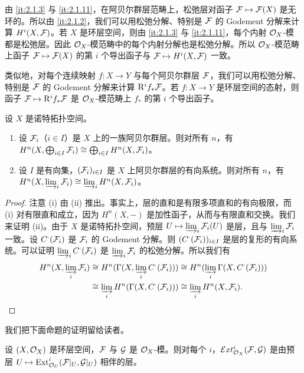 由 \ref{it:2.1.3} 与 \ref{it:2.1.11}，在阿贝尔群层范畴上，松弛层对函子 $\mathcal{F}\mapsto\mathcal{F}(X)$ 是无环的。所以由 \ref{it:2.1.2}，我们可以用松弛分解、特别是 $\mathcal{F}$ 的 Godement 分解来计算 $H^i(X,\mathcal{F})$。若 $X$ 是环层空间，则由 \ref{it:2.1.3} 与 \ref{it:2.1.11}，每个内射 $\mathcal{O}_X$-模都是松弛层。因此 $\mathcal{O}_X$-模范畴中的每个内射分解也是松弛分解。所以 $\mathcal{O}_X$-模范畴上函子 $\mathcal{F}\mapsto\mathcal{F}(X)$ 的第 $i$ 个导出函子与 $\mathcal{F}\mapsto H^i(X,\mathcal{F})$ 一致。

类似地，对每个连续映射 $f\colon X\to Y$ 与每个阿贝尔群层 $\mathcal{F}$，我们可以用松弛分解、特别是 $\mathcal{F}$ 的 Godement 分解来计算 $\mathrm{R}^if_*\mathcal{F}$。若 $f\colon X\to Y$ 是环层空间的态射，则函子 $\mathcal{F}\mapsto\mathrm{R}^if_*\mathcal{F}$ 是 $\mathcal{O}_X$-模范畴上 $f_*$ 的第 $i$ 个导出函子。

\begin{proposition}\label{it:2.1.12}
设 $X$ 是诺特拓扑空间。
\begin{enumerate}[label=(\roman*),leftmargin=2.4em]
  \item 设 $\mathcal{F}_i$（$i\in I$）是 $X$ 上的一族阿贝尔群层。则对所有 $n$，有 $H^n(X,\bigoplus_{i\in I}\mathcal{F}_i)\cong\bigoplus_{i\in I}H^n(X,\mathcal{F}_i)$。
  \item 设 $I$ 是有向集，$(\mathcal{F}_i)_{i\in I}$ 是 $X$ 上阿贝尔群层的有向系统。则对所有 $n$，有 $H^n(X,\varinjlim_i\mathcal{F}_i)\cong\varinjlim_i H^n(X,\mathcal{F}_i)$。
\end{enumerate}
\end{proposition}
\begin{proof}
注意 (i) 由 (ii) 推出。事实上，层的直和是有限多项直和的有向极限，而 (i) 对有限直和成立，因为 $H^n(X,-)$ 是加性函子，从而与有限直和交换。我们来证明 (ii)。由于 $X$ 是诺特拓扑空间，预层 $U\mapsto\varinjlim_i\mathcal{F}_i(U)$ 是层，且与 $\varinjlim_i\mathcal{F}_i$ 一致。设 $C^\cdot(\mathcal{F}_i)$ 是 $\mathcal{F}_i$ 的 Godement 分解。则 $(C^\cdot(\mathcal{F}_i))_{i\in I}$ 是层的复形的有向系统。可以证明 $\varinjlim_i C^\cdot(\mathcal{F}_i)$ 是 $\varinjlim_i\mathcal{F}_i$ 的松弛分解。所以我们有
\[
\begin{aligned}
H^n(X,\varinjlim_i\mathcal{F}_i)&\cong H^n(\Gamma(X,\varinjlim_iC^\cdot(\mathcal{F}_i)))\cong H^n(\varinjlim_i\Gamma(X,C^\cdot(\mathcal{F}_i)))\\
&\cong\varinjlim_iH^n(\Gamma(X,C^\cdot(\mathcal{F}_i)))\cong\varinjlim_iH^n(X,\mathcal{F}_i).
\end{aligned}
\]
\end{proof}

我们把下面命题的证明留给读者。

\begin{proposition}\label{it:2.1.13}
设 $(X,\mathcal{O}_X)$ 是环层空间，$\mathcal{F}$ 与 $\mathcal{G}$ 是 $\mathcal{O}_X$-模。则对每个 $i$，$\mathcal{E}xt^i_{\mathcal{O}_X}(\mathcal{F},\mathcal{G})$ 是由预层 $U\mapsto\operatorname{Ext}^i_{\mathcal{O}_U}(\mathcal{F}|_U,\mathcal{G}|_U)$ 相伴的层。
\end{proposition}

